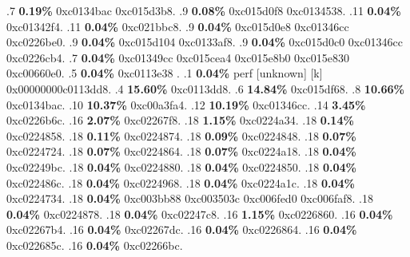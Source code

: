 \begin{profile}
{.7 \textbf{0.19\%} 0xc0134bac\newline {} 0xc015d3b8. 
.9 \textbf{0.08\%} 0xc015d0f8\newline {} 0xc0134538. 
.11 \textbf{0.04\%} 0xc01342f4. 
.11 \textbf{0.04\%} 0xc021bbc8. 
.9 \textbf{0.04\%} 0xc015d0e8\newline {} 0xc01346cc\newline {} 0xc0226be0. 
.9 \textbf{0.04\%} 0xc015d104\newline {} 0xc0133af8. 
.9 \textbf{0.04\%} 0xc015d0c0\newline {} 0xc01346cc\newline {} 0xc0226cb4. 
.7 \textbf{0.04\%} 0xc01349cc\newline {} 0xc015cea4\newline {} 0xc015e8b0\newline {} 0xc015e830\newline {} 0xc00660e0. 
.5 \textbf{0.04\%} 0xc0113e38\newline {} . 
.1 \textbf{ 0.04\%} perf             [unknown]              [k] 0x00000000c0113dd8. 
.4 \textbf{15.60\%} 0xc0113dd8. 
.6 \textbf{14.84\%} 0xc015df68. 
.8 \textbf{10.66\%} 0xc0134bac. 
.10 \textbf{10.37\%} 0xc00a3fa4. 
.12 \textbf{10.19\%} 0xc01346cc. 
.14 \textbf{3.45\%} 0xc0226b6c. 
.16 \textbf{2.07\%} 0xc02267f8. 
.18 \textbf{1.15\%} 0xc0224a34. 
.18 \textbf{0.14\%} 0xc0224858. 
.18 \textbf{0.11\%} 0xc0224874. 
.18 \textbf{0.09\%} 0xc0224848. 
.18 \textbf{0.07\%} 0xc0224724. 
.18 \textbf{0.07\%} 0xc0224864. 
.18 \textbf{0.07\%} 0xc0224a18. 
.18 \textbf{0.04\%} 0xc02249bc. 
.18 \textbf{0.04\%} 0xc0224880. 
.18 \textbf{0.04\%} 0xc0224850. 
.18 \textbf{0.04\%} 0xc022486c. 
.18 \textbf{0.04\%} 0xc0224968. 
.18 \textbf{0.04\%} 0xc0224a1c. 
.18 \textbf{0.04\%} 0xc0224734. 
.18 \textbf{0.04\%} 0xc003bb88\newline {} 0xc003503c\newline {} 0xc006fed0\newline {} 0xc006faf8. 
.18 \textbf{0.04\%} 0xc0224878. 
.18 \textbf{0.04\%} 0xc02247c8. 
.16 \textbf{1.15\%} 0xc0226860. 
.16 \textbf{0.04\%} 0xc02267b4. 
.16 \textbf{0.04\%} 0xc02267dc. 
.16 \textbf{0.04\%} 0xc0226864. 
.16 \textbf{0.04\%} 0xc022685c. 
.16 \textbf{0.04\%} 0xc02266bc. 
}
\end{profile}
